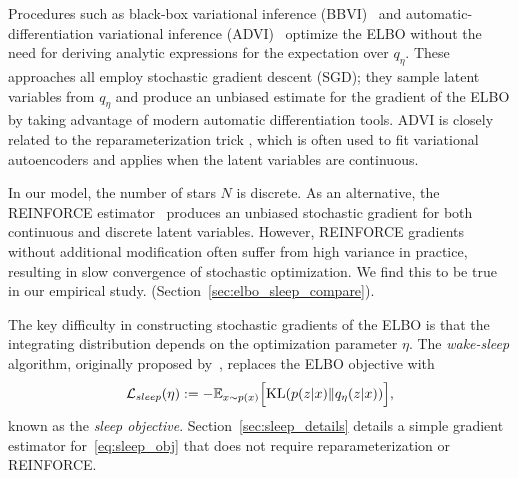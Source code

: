 
Procedures such as black-box variational inference (BBVI)~\citep{ranganath2013black} and 
automatic-differentiation variational inference (ADVI)~\citep{kucukelbir2016automatic}
optimize the ELBO  without the need for 
deriving analytic expressions for the expectation over $q_\eta$.  
These approaches all employ stochastic gradient descent (SGD); 
they sample latent variables from $q_\eta$ and produce an unbiased estimate for the gradient of the ELBO by taking advantage of modern automatic differentiation tools. 
ADVI is closely related to the reparameterization trick \citep{kingma2013autoencoding, rezende2014stochastic}, which is often used to fit variational autoencoders and applies when the latent variables are continuous. 

In our model, the number of stars $N$ is discrete.
As an alternative, the REINFORCE estimator~\citep{Williams1992reinforce} produces an unbiased stochastic gradient for both continuous and discrete latent variables.
However, REINFORCE gradients without additional modification often suffer from high variance in practice, resulting in slow convergence of stochastic optimization. We find this to be true in our empirical study.  (Section~\ref{sec:elbo_sleep_compare}). 

The key difficulty in constructing stochastic gradients of the ELBO is that the integrating distribution depends on the optimization parameter $\eta$. 
The {\itshape wake-sleep} algorithm, originally proposed by~\cite{Hinton1995wake_sleep}, replaces the 
ELBO objective with 
\begin{align}
    \mathcal{L}_{sleep}(\eta) := 
    - \mathbb{E}_{x \sim p(x)}\Big[\textrm{KL}(p(z | x) \| q_\eta(z | x))\Big]
    \label{eq:sleep_obj},
\end{align}
known as the {\itshape sleep objective}.  Section~\ref{sec:sleep_details} details a simple gradient estimator for~\eqref{eq:sleep_obj} that does not require reparameterization or REINFORCE. 

